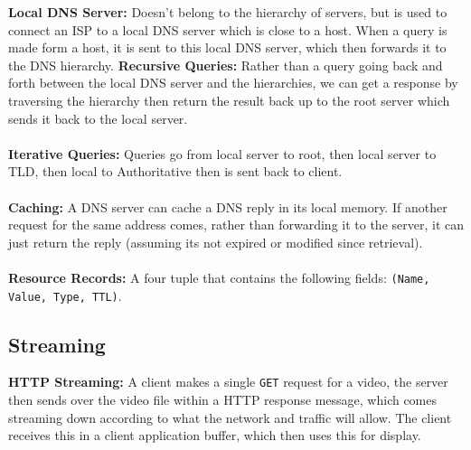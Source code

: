 \documentclass[]{article}
\begin{document}
\textcolor{Emerald}{\textbf{Local DNS Server:}} Doesn't belong to the hierarchy of servers, but is used to connect an ISP to a local DNS server which is close to a host. When a query is made form a host, it is sent to this local DNS server, which then forwards it to the DNS hierarchy. 
\textcolor{Emerald}{\textbf{Recursive Queries:}} Rather than a query going back and forth between the local DNS server and the hierarchies, we can get a response by traversing the hierarchy then return the result back up to the root server which sends it back to the local server. \\\\
\textcolor{Emerald}{\textbf{Iterative Queries:}} Queries go from local server to root, then local server to TLD, then local to Authoritative then is sent back to client. \\\\ 
\textcolor{Emerald}{\textbf{Caching:}} A DNS server can cache a DNS reply in its local memory. If another request for the same address comes, rather than forwarding it to the server, it can just return the reply (assuming its not expired or modified since retrieval). \\\\
\textcolor{Emerald}{\textbf{Resource Records:}} A four tuple that contains the following fields: \texttt{(Name, Value, Type, TTL)}. 
\subsection{Streaming}
\textcolor{Emerald}{\textbf{HTTP Streaming:}} A client makes a single \texttt{GET} request for a video, the server then sends over the video file within a HTTP response message, which comes streaming down according to what the network and traffic will allow. The client receives this in a client application buffer, which then uses this for display. 
\end{document}

